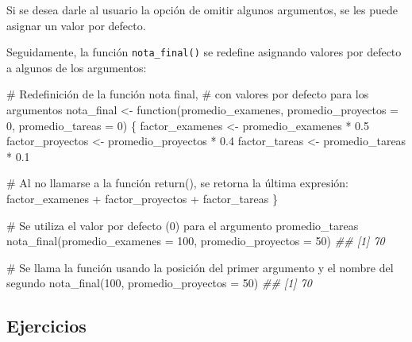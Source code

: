 \documentclass[
  letterpaper,
  DIV=11,
  numbers=noendperiod]{scrreprt}
\newenvironment{Shaded}{\begin{snugshade}}{\end{snugshade}}
\newcommand{\AttributeTok}[1]{\textcolor[rgb]{0.40,0.45,0.13}{#1}}
\newcommand{\CommentTok}[1]{\textcolor[rgb]{0.37,0.37,0.37}{#1}}
\newcommand{\ControlFlowTok}[1]{\textcolor[rgb]{0.00,0.23,0.31}{#1}}
\newcommand{\DecValTok}[1]{\textcolor[rgb]{0.68,0.00,0.00}{#1}}
\newcommand{\DocumentationTok}[1]{\textcolor[rgb]{0.37,0.37,0.37}{\textit{#1}}}
\newcommand{\FloatTok}[1]{\textcolor[rgb]{0.68,0.00,0.00}{#1}}
\newcommand{\FunctionTok}[1]{\textcolor[rgb]{0.28,0.35,0.67}{#1}}
\newcommand{\NormalTok}[1]{\textcolor[rgb]{0.00,0.23,0.31}{#1}}
\newcommand{\OtherTok}[1]{\textcolor[rgb]{0.00,0.23,0.31}{#1}}
\newcommand{\SpecialCharTok}[1]{\textcolor[rgb]{0.37,0.37,0.37}{#1}}
\begin{document}
Si se desea darle al usuario la opción de omitir algunos argumentos, se
les puede asignar un valor por defecto.

Seguidamente, la función \texttt{nota\_final()} se redefine asignando
valores por defecto a algunos de los argumentos:

\begin{Shaded}
\begin{Highlighting}[]
\CommentTok{\# Redefinición de la función nota final,}
\CommentTok{\# con valores por defecto para los argumentos}
\NormalTok{nota\_final }\OtherTok{\textless{}{-}} \ControlFlowTok{function}\NormalTok{(promedio\_examenes,}
                       \AttributeTok{promedio\_proyectos =} \DecValTok{0}\NormalTok{,}
                       \AttributeTok{promedio\_tareas =} \DecValTok{0}\NormalTok{) \{}
\NormalTok{  factor\_examenes }\OtherTok{\textless{}{-}}\NormalTok{ promedio\_examenes }\SpecialCharTok{*} \FloatTok{0.5}
\NormalTok{  factor\_proyectos }\OtherTok{\textless{}{-}}\NormalTok{ promedio\_proyectos }\SpecialCharTok{*} \FloatTok{0.4}
\NormalTok{  factor\_tareas }\OtherTok{\textless{}{-}}\NormalTok{ promedio\_tareas }\SpecialCharTok{*} \FloatTok{0.1}
  
  \CommentTok{\# Al no llamarse a la función return(), se retorna la última expresión:}
\NormalTok{  factor\_examenes }\SpecialCharTok{+}\NormalTok{ factor\_proyectos }\SpecialCharTok{+}\NormalTok{ factor\_tareas}
\NormalTok{\}}

\CommentTok{\# Se utiliza el valor por defecto (0) para el argumento promedio\_tareas}
\FunctionTok{nota\_final}\NormalTok{(}\AttributeTok{promedio\_examenes =} \DecValTok{100}\NormalTok{, }\AttributeTok{promedio\_proyectos =} \DecValTok{50}\NormalTok{)}
\DocumentationTok{\#\# [1] 70}

\CommentTok{\# Se llama la función usando la posición del primer argumento y el nombre del segundo}
\FunctionTok{nota\_final}\NormalTok{(}\DecValTok{100}\NormalTok{, }\AttributeTok{promedio\_proyectos =} \DecValTok{50}\NormalTok{)}
\DocumentationTok{\#\# [1] 70}
\end{Highlighting}
\end{Shaded}

\hypertarget{ejercicios-5}{%
\subsection{Ejercicios}\label{ejercicios-5}}
\end{document}
